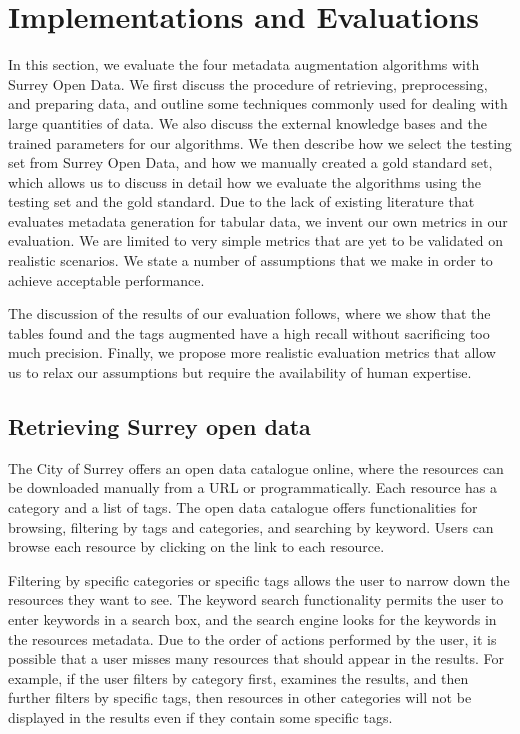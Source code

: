 
\chapter{Implementations and Evaluations}
\label{ch:Implementations}

In this section, we evaluate the four metadata augmentation algorithms with Surrey Open Data. We first discuss the procedure of retrieving, preprocessing, and preparing data, and outline some techniques commonly used for dealing with large quantities of data. We also discuss the external knowledge bases and the trained parameters for our algorithms. We then describe how we select the testing set from Surrey Open Data, and how we manually created a gold standard set, which allows us to discuss in detail how we evaluate the algorithms using the testing set and the gold standard. Due to the lack of existing literature that evaluates metadata generation for tabular data, we invent our own metrics in our evaluation. We are limited to very simple metrics that are yet to be validated on realistic scenarios. We state a number of assumptions that we make in order to achieve acceptable performance.

The discussion of the results of our evaluation follows, where we show that the tables found and the tags augmented have a high recall without sacrificing too much precision. Finally, we propose more realistic evaluation metrics that allow us to relax our assumptions but require the availability of human expertise.

\section{Retrieving Surrey open data}
\label{sec:RetrievingSurreyOpenData}

The City of Surrey offers an open data catalogue online, where the resources can be downloaded manually from a URL or programmatically. Each resource has a category and a list of tags. The open data catalogue offers functionalities for browsing, filtering by tags and categories, and searching by keyword. Users can browse each resource by clicking on the link to each resource.

Filtering by specific categories or specific tags allows the user to narrow down the resources they want to see. The keyword search functionality permits the user to enter keywords in a search box, and the search engine looks for the keywords in the resources metadata. Due to the order of actions performed by the user, it is possible that a user misses many resources that should appear in the results. For example, if the user filters by category first, examines the results, and then further filters by specific tags, then resources in other categories will not be displayed in the results even if they contain some specific tags.

